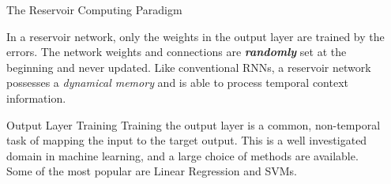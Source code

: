 \documentclass[final]{beamer}
\begin{document}
\begin{columns}[t]
\begin{column}{.45\linewidth}
\begin{block}{\vspace{-13 mm} \LARGE The Reservoir Computing Paradigm}
\begin{figure}[t]
\end{figure}
\large In a reservoir network, only the weights in the output layer are trained by the errors. The network weights and connections are \textbf {\em randomly} set at the beginning and never updated. Like conventional RNNs, a reservoir network possesses a {\em dynamical memory} and is able to process temporal context information.
\end{block}

\bigskip 

\begin{block}{\vspace{-13 mm} \LARGE Output Layer Training}
\large
Training the output layer is a common, non-temporal task of mapping the input to the target output. This is a well investigated domain in machine learning, and a large choice of methods are available. Some of the most popular are Linear Regression and SVMs.
\end{block}


\end{column}

\begin{column}{.45\linewidth}

\bigskip


\end{column}
\end{columns}
\end{document}
